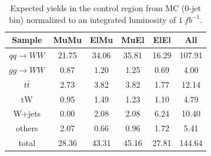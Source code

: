 \begin{table}[!htbp]
\begin{center}
\begin{tabular}{|c|c|c|c|c|c|} \hline
 Sample               &       MuMu &       ElMu &       MuEl &       ElEl &        All \\ \hline\hline
   $qq\rightarrow WW$ &      21.75 &      34.06 &      35.81 &      16.29 &     107.91 \\ 
   $gg\rightarrow WW$ &       0.87 &       1.20 &       1.25 &       0.69 &       4.00 \\ 
  $t\bar t$           &       2.73 &       3.82 &       3.82 &       1.77 &      12.14 \\ 
     tW               &       0.95 &       1.49 &       1.23 &       1.10 &       4.79 \\ 
 W+jets               &       0.00 &       2.08 &       2.08 &       6.24 &      10.40 \\ 
 others               &       2.07 &       0.66 &       0.96 &       1.72 &       5.41 \\ \hline
  total               &      28.36 &      43.31 &      45.16 &      27.81 &     144.64 \\ \hline
\end{tabular}
\caption{Expected yields in the control region from MC (0-jet bin) normalized to an integrated luminosity of $1~fb^{-1}$.}
\label{tab:wwEstimationSByields}
\end{center}
\end{table}

